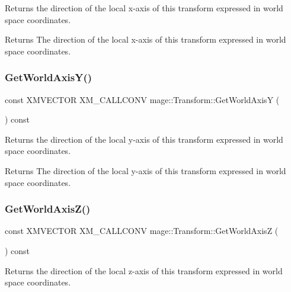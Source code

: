 Returns the direction of the local x-\/axis of this transform expressed in world space coordinates.

\begin{DoxyReturn}{Returns}
The direction of the local x-\/axis of this transform expressed in world space coordinates. 
\end{DoxyReturn}
\mbox{\label{classmage_1_1_transform_ab62a58130aae5e4094b9d6455b4b2561}} 
\subsubsection{\texorpdfstring{Get\+World\+Axis\+Y()}{GetWorldAxisY()}}
{\footnotesize\ttfamily const X\+M\+V\+E\+C\+T\+OR X\+M\+\_\+\+C\+A\+L\+L\+C\+O\+NV mage\+::\+Transform\+::\+Get\+World\+AxisY (\begin{DoxyParamCaption}{ }\end{DoxyParamCaption}) const\hspace{0.3cm}{\ttfamily [noexcept]}}

Returns the direction of the local y-\/axis of this transform expressed in world space coordinates.

\begin{DoxyReturn}{Returns}
The direction of the local y-\/axis of this transform expressed in world space coordinates. 
\end{DoxyReturn}
\mbox{\label{classmage_1_1_transform_a7be63b8fa0f661504404c33572b1c66b}} 
\subsubsection{\texorpdfstring{Get\+World\+Axis\+Z()}{GetWorldAxisZ()}}
{\footnotesize\ttfamily const X\+M\+V\+E\+C\+T\+OR X\+M\+\_\+\+C\+A\+L\+L\+C\+O\+NV mage\+::\+Transform\+::\+Get\+World\+AxisZ (\begin{DoxyParamCaption}{ }\end{DoxyParamCaption}) const\hspace{0.3cm}{\ttfamily [noexcept]}}

Returns the direction of the local z-\/axis of this transform expressed in world space coordinates.

